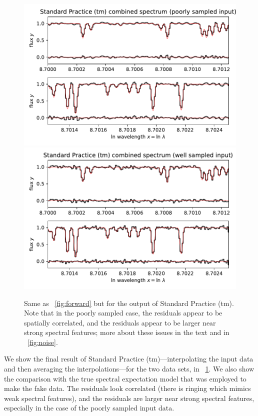 \documentclass[modern]{aastex631}
\newlength{\figurewidth}
\begin{document}
\begin{figure}[t!]
    \begin{mdframed}\begin{center}
    \includegraphics[width=\figurewidth]{notebooks/standard1.pdf}\\
    \includegraphics[width=\figurewidth]{notebooks/standard2.pdf}
    \end{center}
    \caption{Same as \figurename~\ref{fig:forward} but for the output of Standard Practice (tm). Note that in the poorly sampled case, the residuals appear to be spatially correlated, and the residuals appear to be larger near strong spectral features; more about these issues in the text and in \figurename~\ref{fig:noise}.\label{fig:standard}}
    \end{mdframed}
\end{figure}
We show the final result of Standard Practice (tm)---interpolating the input data and then averaging the interpolations---for the two data sets, in \figurename~\ref{fig:standard}.
We also show the comparison with the true spectral expectation model that was employed to make the fake data.
The residuals look correlated (there is ringing which mimics weak spectral features), and the residuals are larger near strong spectral features, especially in the case of the poorly sampled input data.
\end{document}
